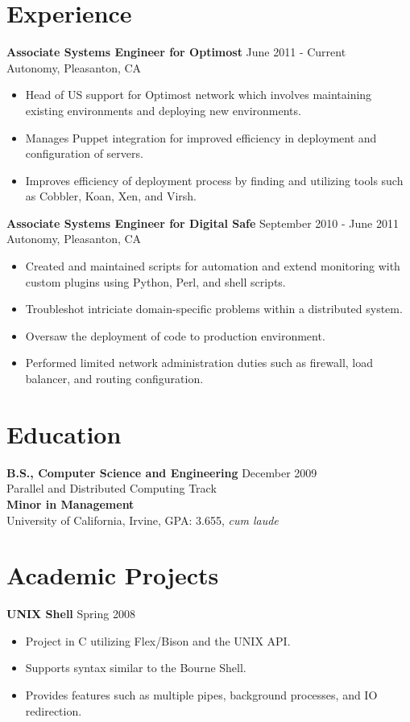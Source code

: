 \documentclass[10pt,line,margin,letterpaper]{res}
\begin{document}
\begin{resume}
\section{Experience}
    {\bf Associate Systems Engineer for Optimost} \hfill June 2011 - Current\\
    Autonomy, Pleasanton, CA
    \begin{itemize} \itemsep -2pt
    \item Head of US support for Optimost network which involves maintaining existing environments and deploying new environments.
    \item Manages Puppet integration for improved efficiency in deployment and configuration of servers.
    \item Improves efficiency of deployment process by finding and utilizing tools such as Cobbler, Koan, Xen, and Virsh.
    \end{itemize}

    {\bf Associate Systems Engineer for Digital Safe} \hfill September 2010 - June 2011 \\
    Autonomy, Pleasanton, CA
    \begin{itemize} \itemsep -2pt
    \item Created and maintained scripts for automation and extend monitoring with custom plugins using Python, Perl, and shell scripts.
    \item Troubleshot intriciate domain-specific problems within a distributed system.
    \item Oversaw the deployment of code to production environment.
    \item Performed limited network administration duties such as firewall, load balancer, and routing configuration.
    \end{itemize}

\section{Education}
    {\bf B.S., Computer Science and Engineering} \hfill December 2009 \\
    Parallel and Distributed Computing Track \\
    {\bf Minor in Management} \\
    University of California, Irvine, GPA: 3.655, \textit{cum laude}

\section {Academic Projects}

    {\bf UNIX Shell} \hfill Spring 2008
    \begin{itemize} \itemsep -2pt
    \item Project in C utilizing Flex/Bison and the UNIX API.
    \item Supports syntax similar to the Bourne Shell.
    \item Provides features such as multiple pipes, background processes, and IO redirection.
    \end{itemize}

\end{resume}
\end{document}
